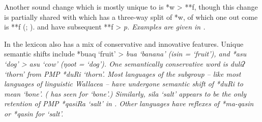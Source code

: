 Another sound change which is mostly unique
to  is *w > **f, though this change is partially
shared with  which has a three-way
split of *w, of which one out come is **f (; \citealp[82ff]{Edwards2021}).
 and   have subsequent **f > \it{p}.
Examples are given in .


In the lexicon  also has a mix of conservative
and innovative features.
Unique semantic shifts include *buaq ‘fruit’ > \it{bua} ‘banana’
(\it{isin} = ‘fruit’), and *asu ‘dog’ > \it{asu} ‘cow’ (\it{ŋoot} = ‘dog’).
One semantically conservative word is \it{duliʔ} ‘thorn’ from PMP *duRi ‘thorn’.
Most languages of the  subgroup -- like most
languages of linguistic Wallacea -- have undergone semantic
shift of *duRi to mean ‘bone’.
( has \it{seen} for ‘bone’.) Similarly,
 \it{sila} ‘salt’ appears to be the only retention of PMP
*qasiRa ‘salt’ in .
Other  languages have reflexes of *ma-qasin
or *qasin for ‘salt’.